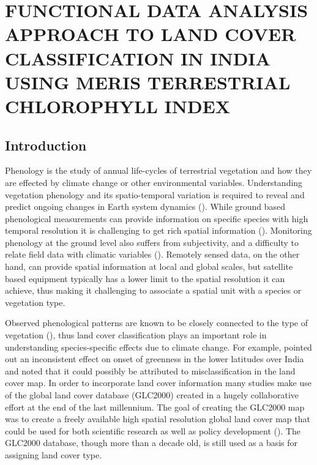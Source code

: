 

\chapter{FUNCTIONAL DATA ANALYSIS APPROACH TO LAND COVER CLASSIFICATION IN INDIA USING MERIS TERRESTRIAL CHLOROPHYLL INDEX} \label{phenology}

\section{Introduction}

Phenology is the study of annual life-cycles of terrestrial vegetation and how they are effected by climate change or other environmental variables. Understanding vegetation phenology and its spatio-temporal variation is required to reveal and predict ongoing changes in Earth system dynamics (\cite{Jeganathan:2010gqa}). While ground based phenological measurements can provide information on specific species with high temporal resolution it is challenging to get rich spatial information (\cite{Studer:2007hd}). Monitoring phenology at the ground level also suffers from subjectivity, and a difficulty to relate field data with climatic variables (\cite{Jeganathan:2010gqa}). Remotely sensed data, on the other hand, can provide spatial information at local and global scales, but satellite based equipment typically has a lower limit to the spatial resolution it can achieve, thus making it challenging to associate a spatial unit with a species or vegetation type. 

Observed phenological patterns are known to be closely connected to the type of vegetation (\cite{Dash:2010kva}), thus land cover classification plays an important role in understanding species-specific effects due to climate change. For example, \cite{Dash:2010kva} pointed out an inconsistent effect on onset of greenness in the lower latitudes over India and noted that it could possibly be attributed to misclassification in the land cover map. In order to incorporate land cover information many studies make use of the global land cover database (GLC2000) created in a hugely collaborative effort at the end of the last millennium. The goal of creating the GLC2000 map was to create a freely available high spatial resolution global land cover map that could be used for both scientific research as well as policy development (\cite{Bartholome:2005cq}). The GLC2000 database, though more than a decade old, is still used as a basis for assigning land cover type. 


